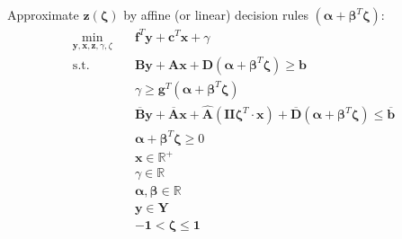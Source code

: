 \documentclass[fleqn,10pt]{wlscirep}
\begin{document}
Approximate $\mathbf{z}(\boldsymbol{\zeta})$ by affine (or linear) decision rules $(\boldsymbol{\alpha} + \boldsymbol{\beta}^T \boldsymbol{\zeta})$:
\begin{align}
    \min_{\mathbf{y}, \mathbf{x}, \mathbf{z}, \gamma, \zeta} \quad& \mathbf{f}^{T} \mathbf{y} + \mathbf{c}^{T} \mathbf{x} + \gamma \\
    \text{s.t.} \quad & \mathbf{B} \mathbf{y} + \mathbf{A} \mathbf{x} + \mathbf{D} (\boldsymbol{\alpha} + \boldsymbol{\beta}^T \boldsymbol{\zeta}) \geq \mathbf{b} \\ 
    & \gamma \geq \mathbf{g}^{T} (\boldsymbol{\alpha} + \boldsymbol{\beta}^T \boldsymbol{\zeta}) \\
    & \overline{\mathbf{B}} \mathbf{y} + \overline{\mathbf{A}} \mathbf{x} + \hat{\mathbf{A}} \left(\mathbf{II} \boldsymbol{\zeta}^{T} \cdot \mathbf{x} \right) + \overline{\mathbf{D}} \left(\boldsymbol{\alpha} + \boldsymbol{\beta}^T \boldsymbol{\zeta} \right) \leq \overline{\mathbf{b}} \\
    & \boldsymbol{\alpha} + \boldsymbol{\beta}^T \boldsymbol{\zeta} \geq 0 \\
    & \mathbf{x} \in \mathbb{R}^{+} \\
    & \gamma \in \mathbb{R} \\
    & \boldsymbol{\alpha}, \boldsymbol{\beta} \in \mathbb{R} \\
    & \mathbf{y} \in \mathbf{Y} \\
    & - \mathbf{1} < \boldsymbol{\zeta}  \leq \mathbf{1}
\end{align}
\end{document}
